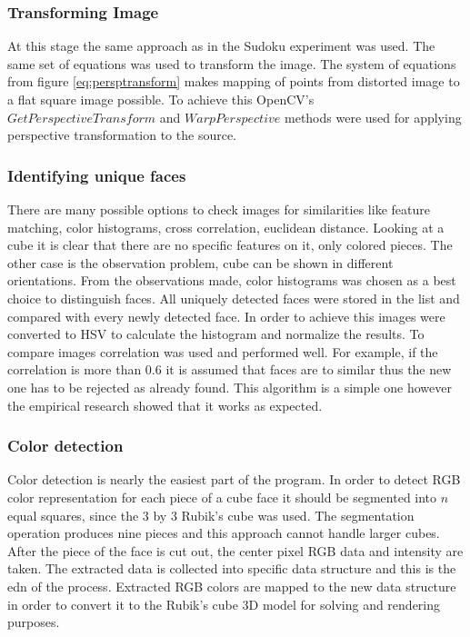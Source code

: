\documentclass[../../main]{subfiles}
\begin{document}
\subsubsection{Transforming Image}

At this stage the same approach as in the Sudoku experiment was used. The same set of equations was used to transform the image. The system of equations from figure \ref{eq:persptransform} makes mapping of points from distorted image to a flat square image possible. To achieve this \ac{OpenCV}'s $GetPerspectiveTransform$ and $WarpPerspective$ methods were used for applying perspective transformation to the source.

\subsubsection{Identifying unique faces}

There are many possible options to check images for similarities like feature matching, color histograms, cross correlation, euclidean distance. Looking at a cube it is clear that there are no specific features on it, only colored pieces. The other case is the observation problem, cube can be shown in different orientations. From the observations made, color histograms was chosen as a best choice to distinguish faces.
All uniquely detected faces were stored in the list and compared with every newly detected face. In order to achieve this images were converted to \ac{HSV} to calculate the histogram and normalize the results. To compare images correlation was used and performed well. For example, if the correlation is more than 0.6 it is assumed that faces are to similar thus the new one has to be rejected as already found.
This algorithm is a simple one however the empirical research showed that it works as expected.

\subsubsection{Color detection}

Color detection is nearly the easiest part of the program. In order to detect \ac{RGB} color representation for each piece of a cube face it should be segmented into $n$ equal squares, since the 3 by 3 Rubik's cube was used. The segmentation operation produces nine pieces and this approach cannot handle larger cubes.
After the piece of the face is cut out, the center pixel \ac{RGB} data and intensity are taken. The extracted data is collected into specific data structure and this is the edn of the process. Extracted \ac{RGB} colors are mapped to the new data structure in order to convert it to the Rubik's cube 3D model for solving and rendering purposes. 
\end{document}
